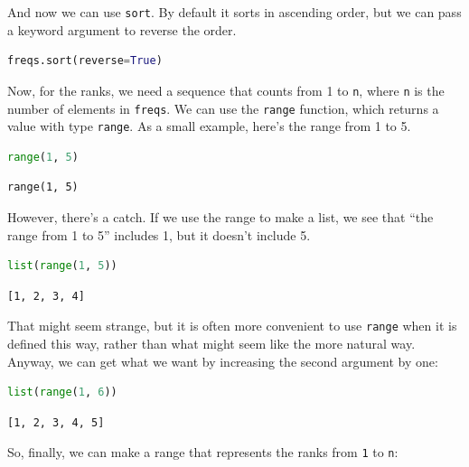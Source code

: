 And now we can use \passthrough{\lstinline!sort!}. By default it sorts
in ascending order, but we can pass a keyword argument to reverse the
order.

\begin{lstlisting}[language=Python,style=source]
freqs.sort(reverse=True)
\end{lstlisting}

Now, for the ranks, we need a sequence that counts from 1 to
\passthrough{\lstinline!n!}, where \passthrough{\lstinline!n!} is the
number of elements in \passthrough{\lstinline!freqs!}. We can use the
\passthrough{\lstinline!range!} function, which returns a value with
type \passthrough{\lstinline!range!}. As a small example, here's the
range from 1 to 5.

\begin{lstlisting}[language=Python,style=source]
range(1, 5)
\end{lstlisting}

\begin{lstlisting}[style=output]
range(1, 5)
\end{lstlisting}

However, there's a catch. If we use the range to make a list, we see
that ``the range from 1 to 5'' includes 1, but it doesn't include 5.

\begin{lstlisting}[language=Python,style=source]
list(range(1, 5))
\end{lstlisting}

\begin{lstlisting}[style=output]
[1, 2, 3, 4]
\end{lstlisting}

That might seem strange, but it is often more convenient to use
\passthrough{\lstinline!range!} when it is defined this way, rather than
what might seem like the more natural way. Anyway, we can get what we
want by increasing the second argument by one:

\begin{lstlisting}[language=Python,style=source]
list(range(1, 6))
\end{lstlisting}

\begin{lstlisting}[style=output]
[1, 2, 3, 4, 5]
\end{lstlisting}

So, finally, we can make a range that represents the ranks from
\passthrough{\lstinline!1!} to \passthrough{\lstinline!n!}:

